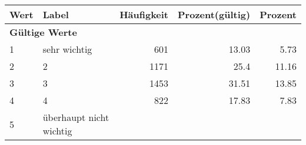      \begin{longtable}{lXrrr}
     \toprule
     \textbf{Wert} & \textbf{Label} & \textbf{Häufigkeit} & \textbf{Prozent(gültig)} & \textbf{Prozent} \\
     \endhead
     \midrule
     \multicolumn{5}{l}{\textbf{Gültige Werte}}\\

     1 &
     \multicolumn{1}{X}{ sehr wichtig   } &


       \num{601} &
       \num[round-mode=places,round-precision=2]{13,03} &
         \num[round-mode=places,round-precision=2]{5,73} \\

     2 &
     \multicolumn{1}{X}{ 2   } &


       \num{1171} &
       \num[round-mode=places,round-precision=2]{25,4} &
         \num[round-mode=places,round-precision=2]{11,16} \\

     3 &
     \multicolumn{1}{X}{ 3   } &


       \num{1453} &
       \num[round-mode=places,round-precision=2]{31,51} &
         \num[round-mode=places,round-precision=2]{13,85} \\

     4 &
     \multicolumn{1}{X}{ 4   } &


       \num{822} &
       \num[round-mode=places,round-precision=2]{17,83} &
         \num[round-mode=places,round-precision=2]{7,83} \\

     5 &
     \multicolumn{1}{X}{ überhaupt nicht wichtig   } &



\end{longtable}
